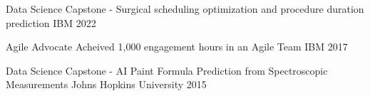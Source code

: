 

\begin{cvhonors}

  \cvhonor
    {Data Science} %
    {Capstone - Surgical scheduling optimization and procedure duration prediction} %
    {IBM} %
    {2022} %

  \cvhonor
    {Agile Advocate} %
    {Acheived 1,000 engagement hours in an Agile Team} %
    {IBM} %
    {2017} %

  \cvhonor
    {Data Science} %
    {Capstone - AI Paint Formula Prediction from Spectroscopic Measurements} %
    {Johns Hopkins University} %
    {2015} %

\end{cvhonors}
